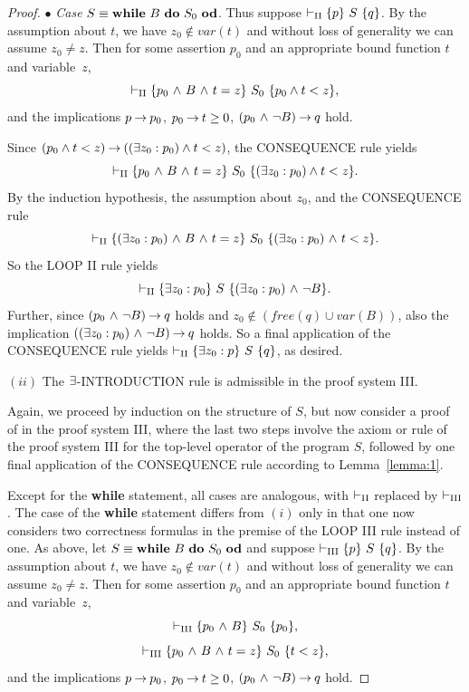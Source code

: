 \documentclass[runningheads]{llncs}       %
\begin{document}
\begin{proof}
\III

\NI
$\bullet$ \emph{Case} $S \equiv \mbox{$\mbox{{\bf while}\ } {B}\ \mbox{{\bf do}\ } {S_0}\ \mbox{{\bf od}}$}$.
Thus suppose $\vdash_{\rm{II}} \mbox{$\{{p}\}\ {S}\ \{{q}\}$}$.
By the assumption about $t$, we have
$z_0 \not \in var(t)$ and without loss of generality we can assume $z_0 \neq z$.
Then for some assertion $p_{0}$ and an appropriate bound function $t$ and
variable~$z$,
\[
 \vdash_{\rm{II}} \mbox{$\{{p_{0} \mbox{$\ \wedge\ $} B \mbox{$\ \wedge\ $} t = z}\}\ {S_0}\ \{{p_0\wedge t < z}\}$},
\]
and the implications
$p \mbox{$\:\rightarrow\:$} p_{0}$, $p_{0} \mbox{$\:\rightarrow\:$} t \ge 0$,  $(p_{0} \mbox{$\ \wedge\ $} \neg B) \mbox{$\:\rightarrow\:$} q$
hold.

Since $(p_0\wedge t<z) \mbox{$\:\rightarrow\:$} ((\mbox{$\exists$} z_0: p_0)\wedge t<z) $, the CONSEQUENCE rule yields
\[
 \vdash_{\rm{II}} \mbox{$\{{p_{0} \mbox{$\ \wedge\ $} B \mbox{$\ \wedge\ $} t=z}\}\ {S_0}\ \{{(\mbox{$\exists$} z_0: p_{0})\wedge t<z }\}$}.
\]
By the induction hypothesis, the assumption about $z_0$,
and the CONSEQUENCE rule 
\[
 \vdash_{\rm{II}} \mbox{$\{{(\mbox{$\exists$} z_0:p_0) \mbox{$\ \wedge\ $} B \mbox{$\ \wedge\ $} t = z}\}\ {S_0}\ \{{(\mbox{$\exists$} z_0:p_0)\mbox{$\ \wedge\ $} t < z}\}$}.
\]
So the LOOP II rule yields 
\[
 \vdash_{\rm{II}} \mbox{$\{{\mbox{$\exists$} z_0:p_0}\}\ {S}\ \{{(\mbox{$\exists$} z_0:p_0) \mbox{$\ \wedge\ $} \neg B}\}$}.
\]
Further, since $(p_{0} \mbox{$\ \wedge\ $} \neg B) \mbox{$\:\rightarrow\:$} q$ holds and
$z_0 \not\in (\mathit{free(q)} \cup var(B))$, also the implication
$((\mbox{$\exists$} z_0:p_0) \mbox{$\ \wedge\ $} \neg B) \mbox{$\:\rightarrow\:$} q$ holds.  So a final application of the
CONSEQUENCE rule yields $\vdash_{\rm{II}} \mbox{$\{{\mbox{$\exists$} z_0:p}\}\ {S}\ \{{q}\}$}$, as
desired.

\III

\NI
$(ii)$ The $\mbox{$\exists$}$-{\rm INTRODUCTION} rule is admissible in the proof system {\rm III}.

Again, we proceed by induction on the structure of $S$,
but now consider a proof of  in the proof system \rm{III}, where 
the last two steps involve the axiom or rule of the proof system \rm{III} 
for the top-level operator of the program $S$, 
followed by one final application of the CONSEQUENCE rule
according to Lemma~\ref{lemma:1}.

Except for the \textbf{while} statement, all cases are analogous, 
with $\vdash_{\rm{II}}$ replaced by $\vdash_{\rm{III}}$. 
The case of the \textbf{while} statement differs from $(i)$ only 
in that one now considers two correctness formulas in the premise 
of the LOOP III rule instead of one. 
As above, let $S \equiv \mbox{$\mbox{{\bf while}\ } {B}\ \mbox{{\bf do}\ } {S_0}\ \mbox{{\bf od}}$}$ and
suppose $\vdash_{\rm{III}} \mbox{$\{{p}\}\ {S}\ \{{q}\}$}$.
By the assumption about $t$, we have
$z_0 \not \in var(t)$ and without loss of generality we can assume $z_0 \neq z$.
Then for some assertion $p_{0}$ and an appropriate bound function $t$ and
variable~$z$,
\[
 \vdash_{\rm{III}} \mbox{$\{{p_{0} \mbox{$\ \wedge\ $} B}\}\ {S_0}\ \{{p_{0}}\}$},
\]
\[
 \vdash_{\rm{III}} \mbox{$\{{p_{0} \mbox{$\ \wedge\ $} B \mbox{$\ \wedge\ $} t = z}\}\ {S_0}\ \{{t < z}\}$},
\]
and the implications
$p \mbox{$\:\rightarrow\:$} p_{0}$, $p_{0} \mbox{$\:\rightarrow\:$} t \ge 0$,  $(p_{0} \mbox{$\ \wedge\ $} \neg B) \mbox{$\:\rightarrow\:$} q$
hold.


\end{proof}
\end{document}
